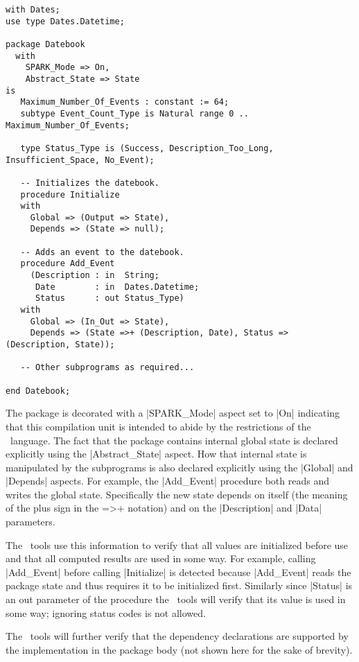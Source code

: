 \begin{lstlisting}
with Dates;
use type Dates.Datetime;

package Datebook
  with
    SPARK_Mode => On,
    Abstract_State => State
is
   Maximum_Number_Of_Events : constant := 64;
   subtype Event_Count_Type is Natural range 0 .. Maximum_Number_Of_Events;

   type Status_Type is (Success, Description_Too_Long, Insufficient_Space, No_Event);

   -- Initializes the datebook.
   procedure Initialize
   with
     Global => (Output => State),
     Depends => (State => null);

   -- Adds an event to the datebook.
   procedure Add_Event
     (Description : in  String;
      Date        : in  Dates.Datetime;
      Status      : out Status_Type)
   with
     Global => (In_Out => State),
     Depends => (State =>+ (Description, Date), Status => (Description, State));

   -- Other subprograms as required...

end Datebook;
\end{lstlisting}

The package is decorated with a |SPARK_Mode| aspect set to |On| indicating that this compilation
unit is intended to abide by the restrictions of the \SPARK\ language. The fact that the package
contains internal global state is declared explicitly using the |Abstract_State| aspect. How
that internal state is manipulated by the subprograms is also declared explicitly using the
|Global| and |Depends| aspects. For example, the |Add_Event| procedure both reads and writes the
global state. Specifically the new state depends on itself (the meaning of the plus sign in the
=>+ notation) and on the |Description| and |Data| parameters.

The \SPARK\ tools use this information to verify that all values are initialized before use and
that all computed results are used in some way. For example, calling |Add_Event| before calling
|Initialize| is detected because |Add_Event| reads the package state and thus requires it to be
initialized first. Similarly since |Status| is an out parameter of the procedure the \SPARK\
tools will verify that its value is used in some way; ignoring status codes is not allowed.

The \SPARK\ tools will further verify that the dependency declarations are supported by the
implementation in the package body (not shown here for the sake of brevity).

